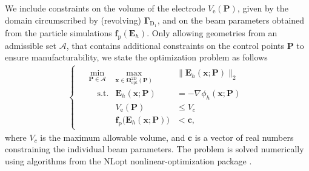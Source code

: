 \documentclass[journal, transmag]{IEEEtran}
\begin{document}
    We include constraints on the volume of the electrode $V_{\mathrm{e}}(\mathbf{P})$, given by the domain circumscribed by (revolving) $\boldsymbol{\Gamma}_{\mathrm{D}_1}$, and on the beam parameters obtained from the particle simulations $\mathbf{f}_{\mathrm{p}}(\mathbf{E}_h)$. Only allowing geometries from an admissible set $\mathcal{A}$, that contains additional constraints on the control points $\mathbf{P}$ to ensure manufacturability, we state the optimization problem as follows
    \begin{align*}
        \begin{cases}
            \begin{alignedat}{2}
                &\min_{\mathbf{P} \in \mathcal{A}} &\max_{\mathbf{x} \in \boldsymbol{\Omega}_{\mathrm{opt}}^{\mathrm{2D}}(\mathbf{P})} &\| \mathbf{E}_h(\mathbf{x}; \mathbf{P}) \|_2\\
                &\quad \mathrm{s.t.} &\mathbf{E}_h(\mathbf{x}; \mathbf{P}) &= - \nabla \phi_h(\mathbf{x}; \mathbf{P})\\
                &\quad &V_{\mathrm{e}}(\mathbf{P}) &\leq V_c\\
                &\quad &\mathbf{f}_{\mathrm{p}} \Big( \mathbf{E}_h(\mathbf{x}; \mathbf{P}) \Big) &< \mathbf{c},
            \end{alignedat}
        \end{cases}
    \end{align*}
    where $V_c$ is the maximum allowable volume, and $\mathbf{c}$ is a vector of real numbers constraining the individual beam parameters. The problem is solved numerically using algorithms from the NLopt nonlinear-optimization package \cite{johnson2020}.
\end{document}
